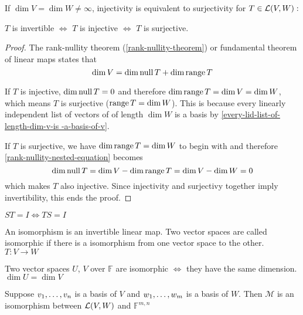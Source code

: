 \setcounter{thm}{64}
\begin{thm}
    \label{injectivity-is-equivalent-to-surjectivity}
    If $\dim V = \dim W \neq \infty$, injectivity is equivalent to surjectivity for $T\in \mathcal{L}(V,W):$

    $T$ is invertible $\iff$ $T$ is injective $\iff$ $T$ is surjective.
\end{thm}
\begin{proof}
    The rank-nullity theorem (\ref{rank-nullity-theorem}) or fundamental theorem of linear maps states that
    \begin{equation}
        \label{rank-nullity-nested-equation}
        \dim V = \dim \operatorname{null} T + \dim \operatorname{range} T
    \end{equation}

    If $T$ is injective, $\dim \operatorname{null} T = 0$ and therefore $\dim \operatorname{range} T = \dim V = \dim W$, which means $T$ is surjective ($\operatorname{range} T = \dim W$). This is because every linearly independent list of vectors of of length $\dim W$ is a basis by \ref{every-lid-list-of-length-dim-v-is -a-basis-of-v}.

    If $T$ is surjective, we have $\dim \operatorname{range} T = \dim W$ to begin with and therefore \ref{rank-nullity-nested-equation} becomes
    \begin{equation}
        \dim \operatorname{null} T = \dim V - \dim \operatorname{range} T = \dim V - \dim W = 0
    \end{equation}
    which makes $T$ also injective. Since injectivity and surjectivy together imply invertibility, this ends the proof.
\end{proof}


\setcounter{thm}{67}
\begin{thm}
    $ST = I \Leftrightarrow TS=I$
\end{thm}

\begin{thm}
    An isomorphism is an invertible linear map. Two vector spaces are called isomorphic if there is a isomorphism from one vector space to the other. $T:V\to W$
\end{thm}

\begin{thm}
    Two \fd vector spaces $U$, $V$ over $\mathbb{F}$ are isomorphic $\iff$ they have the same dimension. $\dim U = \dim V$
\end{thm}

\begin{thm}
    Suppose $v_1, \dots, v_n$ is a basis of $V$ and $w_1, \dots, w_m$ is a basis of $W$. Then $\mathcal{M}$ is an isomorphism between ${\mathcal{L}(V,W)}$ and $\mathbb{F}^{m,n}$
\end{thm}

